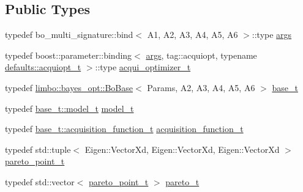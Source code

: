 \subsection*{Public Types}
\begin{DoxyCompactItemize}
\item 
typedef bo\+\_\+multi\+\_\+signature\+::bind$<$ A1, A2, A3, A4, A5, A6 $>$\+::type \hyperlink{classlimbo_1_1experimental_1_1bayes__opt_1_1_bo_multi_afbec2602c4a22ad0a1285cc813a51c58}{args}
\item 
typedef boost\+::parameter\+::binding$<$ \hyperlink{classlimbo_1_1experimental_1_1bayes__opt_1_1_bo_multi_afbec2602c4a22ad0a1285cc813a51c58}{args}, tag\+::acquiopt, typename \hyperlink{structlimbo_1_1experimental_1_1bayes__opt_1_1_bo_multi_1_1defaults_a24be1814310958ec5808cb9856cf8c74}{defaults\+::acquiopt\+\_\+t} $>$\+::type \hyperlink{classlimbo_1_1experimental_1_1bayes__opt_1_1_bo_multi_aeea7e1ae62b3116ea392b098c40a1676}{acqui\+\_\+optimizer\+\_\+t}
\item 
typedef \hyperlink{classlimbo_1_1bayes__opt_1_1_bo_base}{limbo\+::bayes\+\_\+opt\+::\+Bo\+Base}$<$ Params, A2, A3, A4, A5, A6 $>$ \hyperlink{classlimbo_1_1experimental_1_1bayes__opt_1_1_bo_multi_a62d938e4735374911ea55c4b4f8a6562}{base\+\_\+t}
\item 
typedef \hyperlink{classlimbo_1_1bayes__opt_1_1_bo_base_a151af5c7eef92a82d8813bb2e067d267}{base\+\_\+t\+::model\+\_\+t} \hyperlink{classlimbo_1_1experimental_1_1bayes__opt_1_1_bo_multi_a94e37f45e30ac591bacf36df6767d6ad}{model\+\_\+t}
\item 
typedef \hyperlink{classlimbo_1_1bayes__opt_1_1_bo_base_a200a43abb6c95d2d99660898b36f2200}{base\+\_\+t\+::acquisition\+\_\+function\+\_\+t} \hyperlink{classlimbo_1_1experimental_1_1bayes__opt_1_1_bo_multi_af5c8c4b0a4912c1efa5e0156a83b06ab}{acquisition\+\_\+function\+\_\+t}
\item 
typedef std\+::tuple$<$ Eigen\+::\+Vector\+Xd, Eigen\+::\+Vector\+Xd, Eigen\+::\+Vector\+Xd $>$ \hyperlink{classlimbo_1_1experimental_1_1bayes__opt_1_1_bo_multi_a1a48dd47159458edc16374082379879e}{pareto\+\_\+point\+\_\+t}
\item 
typedef std\+::vector$<$ \hyperlink{classlimbo_1_1experimental_1_1bayes__opt_1_1_bo_multi_a1a48dd47159458edc16374082379879e}{pareto\+\_\+point\+\_\+t} $>$ \hyperlink{classlimbo_1_1experimental_1_1bayes__opt_1_1_bo_multi_ae2b586fb9056fdfba859b288927a2f1c}{pareto\+\_\+t}
\end{DoxyCompactItemize}

